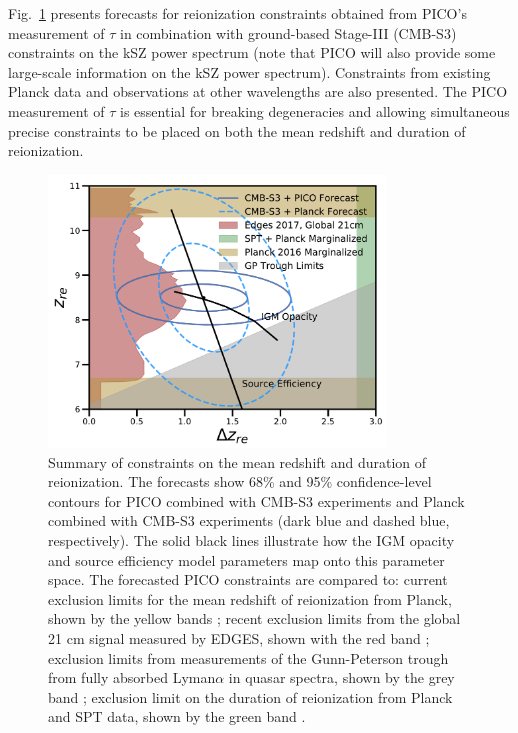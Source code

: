 \documentclass[PICOReport.tex]{subfiles}
\begin{document}
Fig.~\ref{fig:ReionizationPICO} presents forecasts for reionization constraints obtained from PICO's measurement of $\tau$ in combination with ground-based Stage-III (CMB-S3) constraints on the kSZ power spectrum (note that PICO will also provide some large-scale information on the kSZ power spectrum).  Constraints from existing Planck data and observations at other wavelengths are also presented.  The PICO measurement of $\tau$ is essential for breaking degeneracies and allowing simultaneous precise constraints to be placed on both the mean redshift and duration of reionization.

\begin{figure}
\includegraphics[width=0.8\textwidth]{images/Reionization_Contours_zbar_delz_PICO_NEW.pdf}
\caption{\label{fig:ReionizationPICO} Summary of constraints on the mean redshift and duration of reionization. The forecasts show 68\% and 95\% confidence-level contours for PICO combined with CMB-S3 experiments and Planck combined with CMB-S3 experiments (dark blue and dashed blue, respectively). The solid black lines illustrate how the IGM opacity and source efficiency model parameters map onto this parameter space. The forecasted PICO constraints are compared to: current exclusion limits for the mean redshift of reionization from Planck, shown by the yellow bands \citealp{planck2018:parameters}; recent exclusion limits from the global 21 cm signal measured by EDGES, shown with the red band \citealp{edges2017}; exclusion limits from measurements of the Gunn-Peterson trough from fully absorbed Lyman$\alpha$ in quasar spectra, shown by the grey band \citealp{Fan2006}; exclusion limit on the duration of reionization from Planck and SPT data, shown by the green band \citealp{planck_reio:2016}.}
\end{figure}
\end{document}
